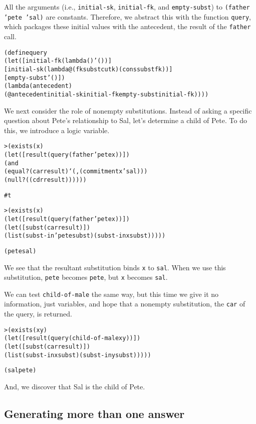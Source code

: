 All the arguments (i.e., \texttt{initial-sk}, \texttt{initial-fk}, and
\texttt{empty-subst}) to \texttt{(father 'pete 'sal)} are
constants. Therefore, we abstract this with the function
\texttt{query}, which packages these initial values with the
antecedent, the result of the \texttt{father} call.

\begin{alltt}
(define query
  (let ([initial-fk (lambda () '())]
        [initial-sk (lambda@ (fk subst cutk) (cons subst fk))]
        [empty-subst '()])
    (lambda (antecedent)
      (@ antecedent initial-sk initial-fk empty-subst initial-fk))))
\end{alltt}

We next consider the role of nonempty substitutions.  Instead of
asking a specific question about Pete's relationship to Sal, let's
determine a child of Pete.  To do this, we introduce a logic variable.

\begin{alltt}
> (exists (x)
    (let ([result (query (father 'pete x))])
      (and
        (equal? (car result) `(,(commitment x 'sal)))
        (null? ((cdr result))))))

#t
\end{alltt}

\begin{alltt}
> (exists (x)
    (let ([result (query (father 'pete x))])
      (let ([subst (car result)])
        (list (subst-in 'pete subst) (subst-in x subst)))))

(pete sal)
\end{alltt}

\noindent
We see that the resultant substitution binds \texttt{x} to \texttt{sal}.
When we use this substitution, \texttt{pete} becomes \texttt{pete},
but \texttt{x} becomes \texttt{sal}.

We can test \texttt{child-of-male} the same way, but this time we give
it no information, just variables, and hope that a nonempty
substitution, the \texttt{car} of the query, is returned.
\newpage
\begin{alltt}
> (exists (x y)
    (let ([result (query (child-of-male x y))])
      (let ([subst (car result)])
         (list (subst-in x subst) (subst-in y subst)))))

(sal pete)
\end{alltt}

And, we discover that Sal is the child of Pete.

\subsection{Generating more than one answer}


